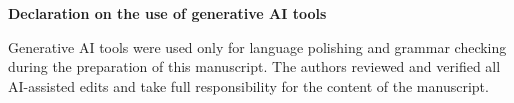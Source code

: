 \documentclass[sigconf,nonacm]{acmart}
\begin{document}
\begin{acks}
\noindent\textbf{Declaration on the use of generative AI tools}\par
Generative AI tools were used only for language polishing and grammar checking during the preparation of this manuscript. The authors reviewed and verified all AI-assisted edits and take full responsibility for the content of the manuscript.\label{last-body-page}
\end{acks}



\end{document}

